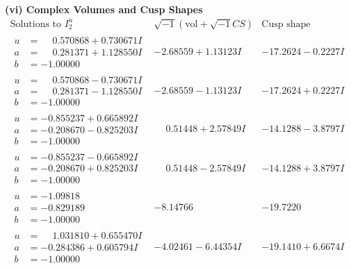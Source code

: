 \documentclass[1p]{elsarticle_modified}
\theoremstyle{definition}
\newcommand{\I}{\sqrt{-1}}
\begin{document}
\newpage\flushleft \textbf{(vi) Complex Volumes and Cusp Shapes}
$$\begin{array}{c|c|c}  
\text{Solutions to }I^u_{2}& \I (\text{vol} + \sqrt{-1}CS) & \text{Cusp shape}\\
 \hline 
\begin{aligned}
u &= \phantom{-}0.570868 + 0.730671 I \\
a &= \phantom{-}0.281371 + 1.128550 I \\
b &= -1.00000\phantom{ +0.000000I}\end{aligned}
 & -2.68559 + 1.13123 I & -17.2624 - 0.2227 I \\ \hline\begin{aligned}
u &= \phantom{-}0.570868 - 0.730671 I \\
a &= \phantom{-}0.281371 - 1.128550 I \\
b &= -1.00000\phantom{ +0.000000I}\end{aligned}
 & -2.68559 - 1.13123 I & -17.2624 + 0.2227 I \\ \hline\begin{aligned}
u &= -0.855237 + 0.665892 I \\
a &= -0.208670 - 0.825203 I \\
b &= -1.00000\phantom{ +0.000000I}\end{aligned}
 & \phantom{-}0.51448 + 2.57849 I & -14.1288 - 3.8797 I \\ \hline\begin{aligned}
u &= -0.855237 - 0.665892 I \\
a &= -0.208670 + 0.825203 I \\
b &= -1.00000\phantom{ +0.000000I}\end{aligned}
 & \phantom{-}0.51448 - 2.57849 I & -14.1288 + 3.8797 I \\ \hline\begin{aligned}
u &= -1.09818\phantom{ +0.000000I} \\
a &= -0.829189\phantom{ +0.000000I} \\
b &= -1.00000\phantom{ +0.000000I}\end{aligned}
 & -8.14766\phantom{ +0.000000I} & -19.7220\phantom{ +0.000000I} \\ \hline\begin{aligned}
u &= \phantom{-}1.031810 + 0.655470 I \\
a &= -0.284386 + 0.605794 I \\
b &= -1.00000\phantom{ +0.000000I}\end{aligned}
 & -4.02461 - 6.44354 I & -19.1410 + 6.6674 I \\ \hline\begin{aligned}

\end{aligned}
\end{array}$$
\end{document}
